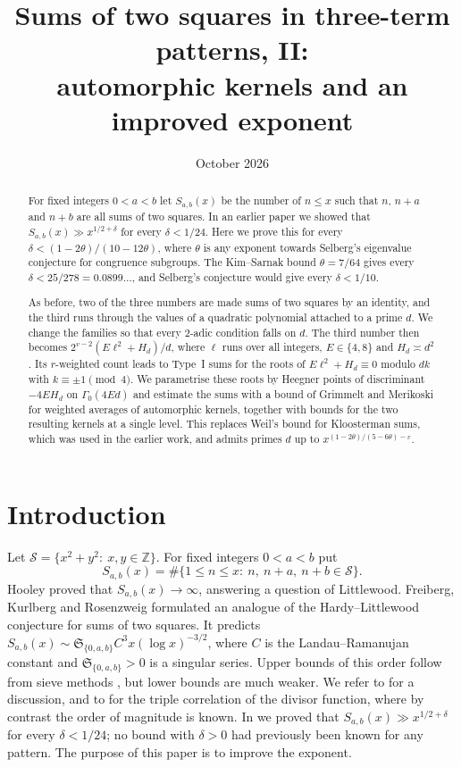 \documentclass[11pt]{amsart}
\title[Sums of two squares in three-term patterns, II]{Sums of two squares in three-term patterns, II:\\ automorphic kernels and an improved exponent}
\date{October 2026}
\theoremstyle{remark}
\theoremstyle{definition}
\numberwithin{equation}{section}
\newcommand{\Sc}{\mathcal{S}}
\newcommand{\Z}{\mathbb{Z}}
\newcommand{\eps}{\varepsilon}
\begin{document}
\begin{abstract}
For fixed integers $0<a<b$ let $S_{a,b}(x)$ be the number of $n\le x$ such that $n$, $n+a$ and $n+b$ are all sums of two squares. In an earlier paper we showed that $S_{a,b}(x)\gg x^{1/2+\delta}$ for every $\delta<1/24$. Here we prove this for every $\delta<(1-2\theta)/(10-12\theta)$, where $\theta$ is any exponent towards Selberg's eigenvalue conjecture for congruence subgroups. The Kim--Sarnak bound $\theta=7/64$ gives every $\delta<25/278=0.0899\ldots$, and Selberg's conjecture would give every $\delta<1/10$.

As before, two of the three numbers are made sums of two squares by an identity, and the third runs through the values of a quadratic polynomial attached to a prime $d$. We change the families so that every $2$-adic condition falls on $d$. The third number then becomes $2^{v-2}(E\ell^2+H_d)/d$, where $\ell$ runs over all integers, $E\in\{4,8\}$ and $H_d\asymp d^2$. Its $r$-weighted count leads to Type~I sums for the roots of $E\ell^2+H_d\equiv0$ modulo $dk$ with $k\equiv\pm1\pmod 4$. We parametrise these roots by Heegner points of discriminant $-4EH_d$ on $\Gamma_0(4Ed)$ and estimate the sums with a bound of Grimmelt and Merikoski for weighted averages of automorphic kernels, together with bounds for the two resulting kernels at a single level. This replaces Weil's bound for Kloosterman sums, which was used in the earlier work, and admits primes $d$ up to $x^{(1-2\theta)/(5-6\theta)-\eps}$.
\end{abstract}

\maketitle

\section{Introduction}

Let $\Sc=\{x^2+y^2:\ x,y\in\Z\}$. For fixed integers $0<a<b$ put
\[
S_{a,b}(x)=\#\{1\le n\le x:\ n,\ n+a,\ n+b\in\Sc\}.
\]
Hooley \cite{Ho73} proved that $S_{a,b}(x)\to\infty$, answering a question of Littlewood. Freiberg, Kurlberg and Rosenzweig \cite[Conjecture~1.1]{FKR} formulated an analogue of the Hardy--Littlewood conjecture for sums of two squares. It predicts $S_{a,b}(x)\sim\mathfrak S_{\{0,a,b\}}C^3x(\log x)^{-3/2}$, where $C$ is the Landau--Ramanujan constant and $\mathfrak S_{\{0,a,b\}}>0$ is a singular series. Upper bounds of this order follow from sieve methods \cite{CD,No}, but lower bounds are much weaker. We refer to \cite[\S1]{I} for a discussion, and to \cite{MMS} for the triple correlation of the divisor function, where by contrast the order of magnitude is known. In \cite{I} we proved that $S_{a,b}(x)\gg x^{1/2+\delta}$ for every $\delta<1/24$; no bound with $\delta>0$ had previously been known for any pattern. The purpose of this paper is to improve the exponent.
\end{document}
